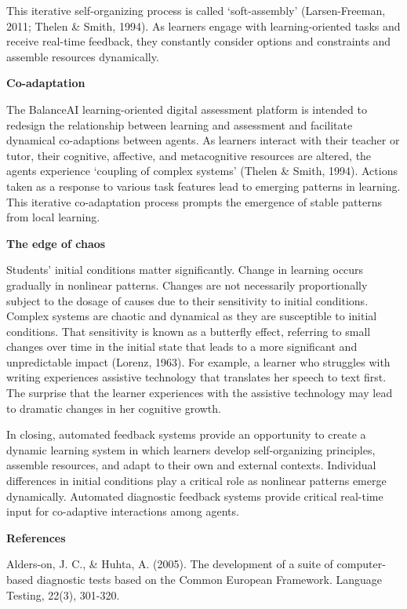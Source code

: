 \documentclass[
]{book}
\begin{document}
This iterative self-organizing process is called `soft-assembly' (Larsen-Freeman, 2011; Thelen \& Smith, 1994). As learners engage with learning-oriented tasks and receive real-time feedback, they constantly consider options and constraints and assemble resources dynamically.

\textbf{Co-adaptation}

The BalanceAI learning-oriented digital assessment platform is intended to redesign the
relationship between learning and assessment and facilitate dynamical co-adaptions between agents. As learners interact with their teacher or tutor, their cognitive, affective, and metacognitive resources are altered, the agents experience `coupling of complex systems' (Thelen \& Smith, 1994). Actions taken as a response to various task features lead to emerging patterns in learning. This iterative co-adaptation process prompts the emergence of stable patterns from local learning.

\textbf{The edge of chaos}

Students' initial conditions matter significantly. Change in learning occurs gradually in nonlinear patterns. Changes are not necessarily proportionally subject to the dosage of causes due to their sensitivity to initial conditions. Complex systems are chaotic and dynamical as they are susceptible to initial conditions. That sensitivity is known as a butterfly effect, referring to small changes over time in the initial state that leads to a more significant and unpredictable impact (Lorenz, 1963). For example, a learner who struggles with writing experiences assistive technology that translates her speech to text first. The surprise that the learner experiences with the assistive technology may lead to dramatic changes in her cognitive growth.

In closing, automated feedback systems provide an opportunity to create a dynamic learning system in which learners develop self-organizing principles, assemble resources, and adapt to their own and external contexts. Individual differences in initial conditions play a critical role as nonlinear patterns emerge dynamically. Automated diagnostic feedback systems provide critical real-time input for co-adaptive interactions among agents.

\textbf{References}

Alders-on, J. C., \& Huhta, A. (2005). The development of a suite of computer-based diagnostic tests based on the Common European Framework. Language Testing, 22(3), 301-320.
\end{document}
